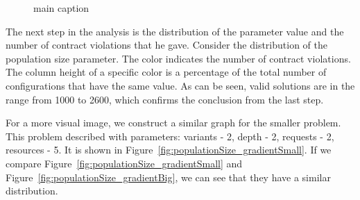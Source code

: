 \begin{figure}
	
	
	\caption{main caption}	
\end{figure}

The next step in the analysis is the distribution of the parameter value and the number of contract violations that he gave. Consider the distribution of the population size parameter.
The color indicates the number of contract violations. The column height of a specific color is a percentage of the total number of configurations that have the same value. As can be seen, valid solutions are in the range from 1000 to 2600, which confirms the conclusion from the last step.

For a more visual image, we construct a similar graph for the smaller problem. This problem described with parameters: variants - 2, depth - 2, requests - 2, resources - 5.
It is shown in Figure~\ref{fig:populationSize_gradientSmall}. If we compare Figure~\ref{fig:populationSize_gradientSmall} and Figure~\ref{fig:populationSize_gradientBig}, we can see that they have a similar distribution.

